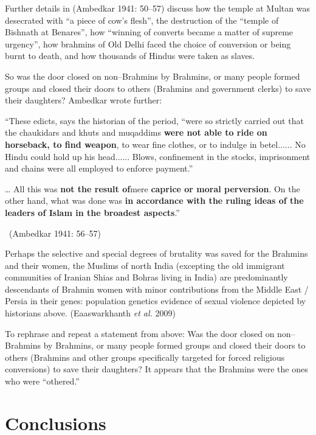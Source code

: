Further details in (Ambedkar 1941: 50–57) discuss how the temple at Multan was desecrated with “a piece of cow’s flesh”, the destruction of the “temple of Bishnath at Benares”, how “winning of converts became a matter of supreme urgency”, how brahmins of Old Delhi faced the choice of conversion or being burnt to death, and how thousands of Hindus were taken as slaves.

So was the door closed on non–Brahmins by Brahmins, or many people formed groups and closed their doors to others (Brahmins and government clerks) to save their daughters? Ambedkar wrote further:

\begin{myquote}
“These edicts, says the historian of the period, “were so strictly carried out that the chaukidars and khuts and muqaddims \textbf{were not able to ride on horseback, to find weapon}, to wear fine clothes, or to indulge in betel...... No Hindu could hold up his head...... Blows, confinement in the stocks, imprisonment and chains were all employed to enforce payment.”
\end{myquote}

\begin{myquote}
… All this was \textbf{not the result of}mere \textbf{caprice or moral perversion}. On the other hand, what was done was \textbf{in accordance with the ruling ideas of the leaders of Islam in the broadest aspects}.” 

~\hfill (Ambedkar 1941: 56–57)
\end{myquote}

Perhaps the selective and special degrees of brutality was saved for the Brahmins and their women, the Muslims of north India (excepting the old immigrant communities of Iranian Shias and Bohras living in India) are predominantly descendants of Brahmin women with minor contributions from the Middle East / Persia in their genes: population genetics evidence of sexual violence depicted by historians above. (Eaaswarkhanth \textit{et al.} 2009)

To rephrase and repeat a statement from above: Was the door closed on non–Brahmins by Brahmins, or many people formed groups and closed their doors to others (Brahmins and other groups specifically targeted for forced religious conversions) to save their daughters? It appears that the Brahmins were the ones who were “othered.”


\section*{Conclusions}

